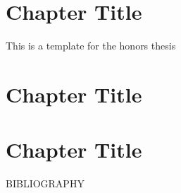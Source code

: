 \documentclass[12pt]{baylor}
\theoremstyle{definition}
\begin{document}
\makeAbstractPage
\makeSignaturePage
\makeTitlePage


\pagestyle{plain}
\setcounter{page}{2}



\tableofcontents
\cleardoublepage
{}
\setcounter{page}{1}

\chapter{Chapter Title}
This is a template for the honors thesis

\chapter{Chapter Title}

\chapter{Chapter Title}


\pagebreak
{}
\begin{center}
\vspace*{.25in}
 \MakeUppercase{Bibliography}
\end{center}
\printbibliography[heading = none]
\end{document}
